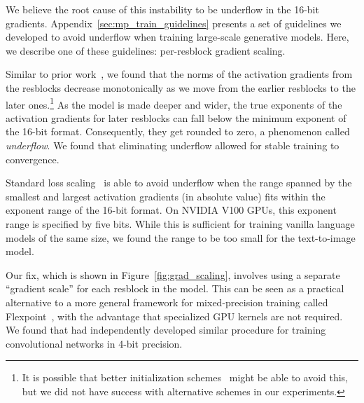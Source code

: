 \documentclass{article}
\begin{document}
We believe the root cause of this instability to be underflow in the 16-bit gradients. Appendix~\ref{sec:mp_train_guidelines} presents a set of guidelines we developed to avoid underflow when training large-scale generative models. Here, we describe one of these guidelines: per-resblock gradient scaling.

Similar to prior work~\cite{liu2020understanding}, we found that the norms of the activation gradients from the resblocks decrease monotonically as we move from the earlier resblocks to the later ones.\footnote{It is possible that better initialization schemes~\cite{liu2020understanding} might be able to avoid this, but we did not have success with alternative schemes in our experiments.} As the model is made deeper and wider, the true exponents of the activation gradients for later resblocks can fall below the minimum exponent of the 16-bit format. Consequently, they get rounded to zero, a phenomenon called \emph{underflow}. We found that eliminating underflow allowed for stable training to convergence.

Standard loss scaling~\cite{micikevicius2017mixed} is able to avoid underflow when the range spanned by the smallest and largest activation gradients (in absolute value) fits within the exponent range of the 16-bit format. On NVIDIA V100 GPUs, this exponent range is specified by five bits. While this is sufficient for training vanilla language models of the same size, we found the range to be too small for the text-to-image model.

Our fix, which is shown in Figure~\ref{fig:grad_scaling}, involves using a separate ``gradient scale'' for each resblock in the model. This can be seen as a practical alternative to a more general framework for mixed-precision training called Flexpoint~\cite{koster2017flexpoint}, with the advantage that specialized GPU kernels are not required. We found that \citet{sun2020ultra} had independently developed similar procedure for training convolutional networks in 4-bit precision.
\end{document}
